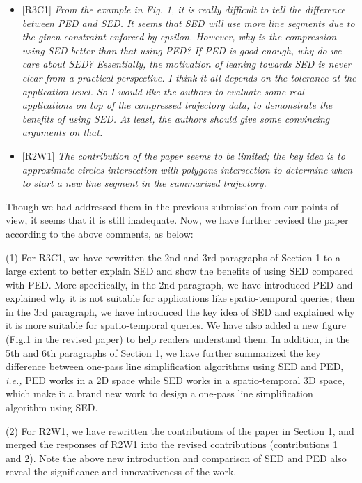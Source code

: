 \documentclass{letter}
\newcommand{\ie}{\emph{i.e.,}\xspace}
\begin{document}
\begin{itemize}
  \item {{[R3C1]} \emph{From the example in Fig. 1, it is really difficult to tell the difference between PED and SED. It seems that SED will use more line segments due to the given constraint enforced by epsilon. However, why is the compression using SED better than that using PED? If PED is good enough, why do we care about SED? Essentially, the motivation of leaning towards SED is never clear from a practical perspective. I think it all depends on the tolerance at the application level. So I would like the authors to evaluate some real applications on top of the compressed trajectory data, to demonstrate the benefits of using SED. At least, the authors should give some convincing arguments on that.}}
  \item {{[R2W1]} \emph{The contribution of the paper seems to be limited; the key idea is to approximate circles intersection with polygons intersection to determine when to start a new line segment in the summarized trajectory.}}
\end{itemize}

Though we had addressed them in the previous submission from our points of view, it seems that it is still inadequate.
Now, we have further revised the paper according to the above comments, as below:

(1) For R3C1, we have rewritten the 2nd and 3rd paragraphs of Section 1 to a large extent to better explain SED and show the benefits of using SED compared with PED.
More specifically, in the 2nd paragraph, we have introduced PED and explained why it is not suitable for applications like spatio-temporal queries; then in the 3rd paragraph, we have introduced the key idea of SED and explained why it is more suitable for spatio-temporal queries.
We have also added a new figure (Fig.1 in the revised paper) to help readers understand them. In addition, in the 5th and 6th paragraphs of Section 1, we have further summarized the key difference between one-pass line simplification algorithms using SED and PED, \ie PED works in a 2D space while SED works in a spatio-temporal 3D space, which make it a brand new work to design a one-pass line simplification algorithm using SED.

(2) For R2W1, we have rewritten the contributions of the paper in Section 1, and merged the responses of {R2W1} into the revised contributions (contributions 1 and 2). Note the above new introduction and comparison of SED and PED also reveal the significance and innovativeness of the work.
\end{document}
